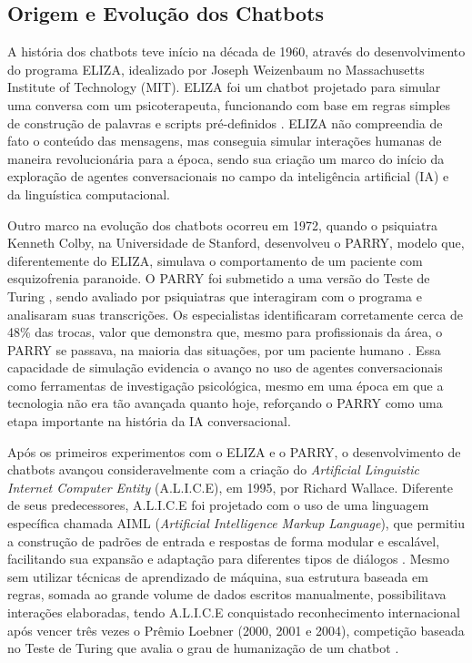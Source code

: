 \subsection{Origem e Evolução dos Chatbots}\label{sec:origem-evolucao-chatbots}

A história dos chatbots teve início na década de 1960, através do desenvolvimento do programa ELIZA, idealizado por Joseph Weizenbaum no Massachusetts Institute of Technology (MIT). ELIZA foi um chatbot projetado para simular uma conversa com um psicoterapeuta, funcionando com base em regras simples de construção de palavras e scripts pré-definidos \cite{weizenbaum1966eliza}. ELIZA não compreendia de fato o conteúdo das mensagens, mas conseguia simular interações humanas de maneira revolucionária para a época, sendo sua criação um marco do início da exploração de agentes conversacionais no campo da inteligência artificial (IA) e da linguística computacional.

Outro marco na evolução dos chatbots ocorreu em 1972, quando o psiquiatra Kenneth Colby, na Universidade de Stanford, desenvolveu o PARRY, modelo que, diferentemente do ELIZA, simulava o comportamento de um paciente com esquizofrenia paranoide. O PARRY foi submetido a uma versão do Teste de Turing \cite{turing1950}, sendo avaliado por psiquiatras que interagiram com o programa e analisaram suas transcrições. Os especialistas identificaram corretamente cerca de 48\% das trocas, valor que demonstra que, mesmo para profissionais da área, o PARRY se passava, na maioria das situações, por um paciente humano \cite{colby1972parry}. Essa capacidade de simulação evidencia o avanço no uso de agentes conversacionais como ferramentas de investigação psicológica, mesmo em uma época em que a tecnologia não era tão avançada quanto hoje, reforçando o PARRY como uma etapa importante na história da IA conversacional.

Após os primeiros experimentos com o ELIZA e o PARRY, o desenvolvimento de chatbots avançou consideravelmente com a criação do \textit{Artificial Linguistic Internet Computer Entity} (A.L.I.C.E), em 1995, por Richard Wallace. Diferente de seus predecessores, A.L.I.C.E foi projetado com o uso de uma linguagem específica chamada AIML (\textit{Artificial Intelligence Markup Language}), que permitiu a construção de padrões de entrada e respostas de forma modular e escalável, facilitando sua expansão e adaptação para diferentes tipos de diálogos \cite{wallace2009alice}. Mesmo sem utilizar técnicas de aprendizado de máquina, sua estrutura baseada em regras, somada ao grande volume de dados escritos manualmente, possibilitava interações elaboradas, tendo A.L.I.C.E conquistado reconhecimento internacional após vencer três vezes o Prêmio Loebner (2000, 2001 e 2004), competição baseada no Teste de Turing \cite{turing1950} que avalia o grau de humanização de um chatbot \cite{shum2018eliza}.

